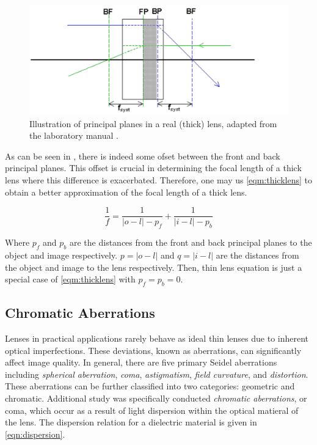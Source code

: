\documentclass[aip, cp, amsmath, amssymb, reprint, nofootinbib]{revtex4-2}
\begin{document}
        \begin{figure}[H]
            \includegraphics[width=0.8\linewidth]{figures/fp-bp.png}
            \caption{Illustration of principal planes in a real (thick) lens, adapted from the laboratory manual \cite{labmanual}.}
            \label{fig:real-lens}
        \end{figure}
        
        As can be seen in , there is indeed some ofset between the front and back principal planes. This offset is crucial in determining the focal length of a thick lens where this difference is exacerbated. Therefore, one may us \eqref{eqm:thicklens} to obtain a better approximation of the focal length of a thick lens.

        \begin{equation} \label{eqm:thicklens}
            \frac{1}{f} = \frac{1}{|o-l|-p_f} + \frac{1}{|i-l|-p_b}
        \end{equation}
        
        Where $p_f$ and $p_b$ are the distances from the front and back principal planes to the object and image respectively. $p = |o-l|$ and $q = |i-l|$ are the distances from the object and image to the lens respectively. Then,  thin lens equation is just a special case of \eqref{eqm:thicklens} with $p_f = p_b = 0$.

        \subsection{Chromatic Aberrations}
        
        Lenses in practical applications rarely behave as ideal thin lenses due to inherent optical imperfections. These deviations, known as aberrations, can significantly affect image quality. In general, there are five primary Seidel aberrations including \textit{spherical aberration}, \textit{coma}, \textit{astigmatism}, \textit{field curvature}, and \textit{distortion}. These aberrations can be further classified into two categories: geometric and chromatic. Additional study was specifically conducted \textit{chromatic aberrations}, or coma, which occur as a result of light dispersion within the optical matieral of the lens. The dispersion relation for a dielectric material is given in \eqref{eqn:dispersion}.
\end{document}
